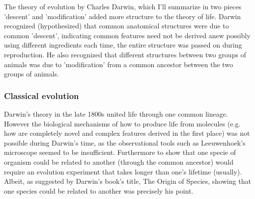The theory of evolution by Charles Darwin, which I'll summarize in two pieces 'descent' and 'modification' added  more structure to the theory of life.  Darwin recognized (hypothesized) that common anatomical structures were due to common 'descent', indicating common features need not be derived anew possibly using different ingredients each time, the entire structure was passed on during reproduction.  He also recognized that different structures between two groups of animals was due to 'modification' from a common ancestor between the two groups of animals.

\subsubsection{Classical evolution}

Darwin's theory in the late 1800s united life through one common lineage.  However the biological mechanisms of how to produce life from molecules (e.g. how are completely novel and complex features derived in the first place) was not possible during Darwin's time, as the observational tools such as Leeuwenhoek's microscope seemed to be insufficient.  Furthermore to show that one specie of organism could be related to another (through the common ancestor) would require an evolution experiment that takes longer than one's lifetime (usually).  Albeit, as suggested by Darwin's book's title, The Origin of Species, showing that one species could be related to another was precisely his point.

